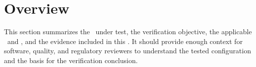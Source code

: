 \section{Overview}
This section summarizes the \stdCfgItem\ under test, the verification objective,
the applicable \stdSyRS\ and \stdSRS, and the evidence included in this
\stdRptPkg.  It should provide enough context for software, quality, and
regulatory reviewers to understand the tested configuration and the basis for the
verification conclusion.
